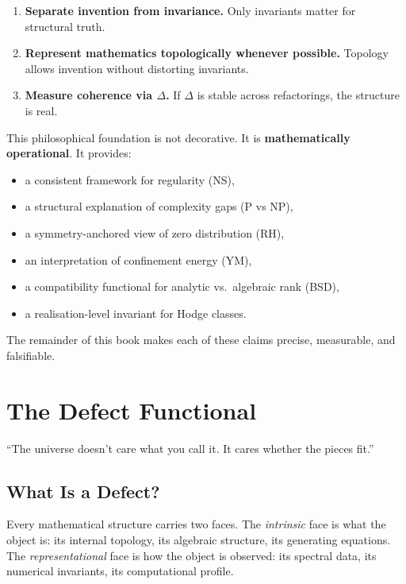 \documentclass[12pt, openany]{book}
\theoremstyle{remark}
\begin{document}
\begin{enumerate}
  \item \textbf{Separate invention from invariance.} Only invariants matter for
        structural truth.
  \item \textbf{Represent mathematics topologically whenever possible.} Topology allows
        invention without distorting invariants.
  \item \textbf{Measure coherence via $\Delta$.} If $\Delta$ is stable across
        refactorings, the structure is real.
\end{enumerate}

\noindent
This philosophical foundation is not decorative. It is \textbf{mathematically operational}.
It provides:
\begin{itemize}
  \item a consistent framework for regularity (NS),
  \item a structural explanation of complexity gaps (P vs NP),
  \item a symmetry-anchored view of zero distribution (RH),
  \item an interpretation of confinement energy (YM),
  \item a compatibility functional for analytic vs.\ algebraic rank (BSD),
  \item a realisation-level invariant for Hodge classes.
\end{itemize}

\noindent
The remainder of this book makes each of these claims precise, measurable, and
falsifiable.

\bigskip


\chapter{The Defect Functional}
\label{ch:defect}

\epigraph{``The universe doesn't care what you call it. It cares whether the pieces fit.''}{}

\section{What Is a Defect?}

Every mathematical structure carries two faces. The \emph{intrinsic} face is what the
object is: its internal topology, its algebraic structure, its generating equations.
The \emph{representational} face is how the object is observed: its spectral data,
its numerical invariants, its computational profile.
\end{document}
